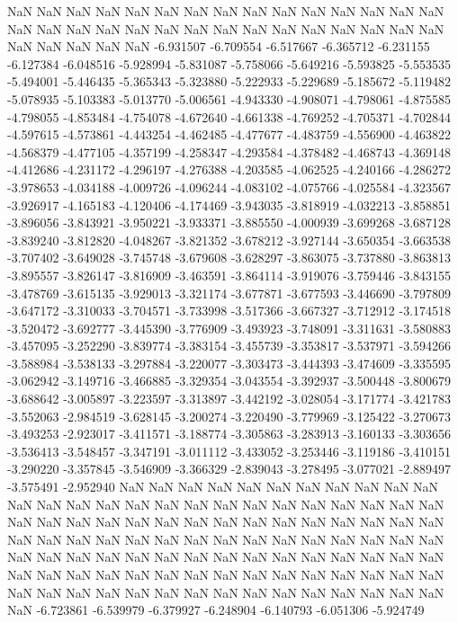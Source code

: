 NaN
NaN
NaN
NaN
NaN
NaN
NaN
NaN
NaN
NaN
NaN
NaN
NaN
NaN
NaN
NaN
NaN
NaN
NaN
NaN
NaN
NaN
NaN
NaN
NaN
NaN
NaN
NaN
NaN
NaN
NaN
NaN
NaN
NaN
NaN
-6.931507
-6.709554
-6.517667
-6.365712
-6.231155
-6.127384
-6.048516
-5.928994
-5.831087
-5.758066
-5.649216
-5.593825
-5.553535
-5.494001
-5.446435
-5.365343
-5.323880
-5.222933
-5.229689
-5.185672
-5.119482
-5.078935
-5.103383
-5.013770
-5.006561
-4.943330
-4.908071
-4.798061
-4.875585
-4.798055
-4.853484
-4.754078
-4.672640
-4.661338
-4.769252
-4.705371
-4.702844
-4.597615
-4.573861
-4.443254
-4.462485
-4.477677
-4.483759
-4.556900
-4.463822
-4.568379
-4.477105
-4.357199
-4.258347
-4.293584
-4.378482
-4.468743
-4.369148
-4.412686
-4.231172
-4.296197
-4.276388
-4.203585
-4.062525
-4.240166
-4.286272
-3.978653
-4.034188
-4.009726
-4.096244
-4.083102
-4.075766
-4.025584
-4.323567
-3.926917
-4.165183
-4.120406
-4.174469
-3.943035
-3.818919
-4.032213
-3.858851
-3.896056
-3.843921
-3.950221
-3.933371
-3.885550
-4.000939
-3.699268
-3.687128
-3.839240
-3.812820
-4.048267
-3.821352
-3.678212
-3.927144
-3.650354
-3.663538
-3.707402
-3.649028
-3.745748
-3.679608
-3.628297
-3.863075
-3.737880
-3.863813
-3.895557
-3.826147
-3.816909
-3.463591
-3.864114
-3.919076
-3.759446
-3.843155
-3.478769
-3.615135
-3.929013
-3.321174
-3.677871
-3.677593
-3.446690
-3.797809
-3.647172
-3.310033
-3.704571
-3.733998
-3.517366
-3.667327
-3.712912
-3.174518
-3.520472
-3.692777
-3.445390
-3.776909
-3.493923
-3.748091
-3.311631
-3.580883
-3.457095
-3.252290
-3.839774
-3.383154
-3.455739
-3.353817
-3.537971
-3.594266
-3.588984
-3.538133
-3.297884
-3.220077
-3.303473
-3.444393
-3.474609
-3.335595
-3.062942
-3.149716
-3.466885
-3.329354
-3.043554
-3.392937
-3.500448
-3.800679
-3.688642
-3.005897
-3.223597
-3.313897
-3.442192
-3.028054
-3.171774
-3.421783
-3.552063
-2.984519
-3.628145
-3.200274
-3.220490
-3.779969
-3.125422
-3.270673
-3.493253
-2.923017
-3.411571
-3.188774
-3.305863
-3.283913
-3.160133
-3.303656
-3.536413
-3.548457
-3.347191
-3.011112
-3.433052
-3.253446
-3.119186
-3.410151
-3.290220
-3.357845
-3.546909
-3.366329
-2.839043
-3.278495
-3.077021
-2.889497
-3.575491
-2.952940
NaN
NaN
NaN
NaN
NaN
NaN
NaN
NaN
NaN
NaN
NaN
NaN
NaN
NaN
NaN
NaN
NaN
NaN
NaN
NaN
NaN
NaN
NaN
NaN
NaN
NaN
NaN
NaN
NaN
NaN
NaN
NaN
NaN
NaN
NaN
NaN
NaN
NaN
NaN
NaN
NaN
NaN
NaN
NaN
NaN
NaN
NaN
NaN
NaN
NaN
NaN
NaN
NaN
NaN
NaN
NaN
NaN
NaN
NaN
NaN
NaN
NaN
NaN
NaN
NaN
NaN
NaN
NaN
NaN
NaN
NaN
NaN
NaN
NaN
NaN
NaN
NaN
NaN
NaN
NaN
NaN
NaN
NaN
NaN
NaN
NaN
NaN
NaN
NaN
NaN
NaN
NaN
NaN
NaN
NaN
NaN
NaN
NaN
NaN
NaN
NaN
NaN
-6.723861
-6.539979
-6.379927
-6.248904
-6.140793
-6.051306
-5.924749
